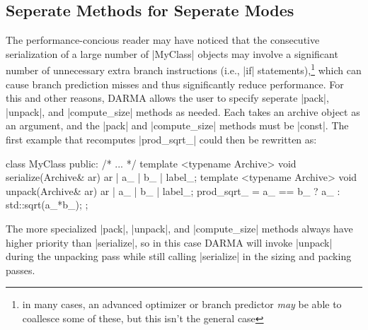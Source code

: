 \subsection{Seperate Methods for Seperate Modes}
The performance-concious reader may have noticed that the consecutive
serialization of a large number of |MyClass| objects may involve a significant
number of unnecessary extra branch instructions (i.e., |if|
statements),\footnote{in many cases, an advanced optimizer or branch predictor
{\it may} be able to coallesce some of these, but this isn't the general case}
which can cause branch prediction misses and thus significantly reduce
performance.  For this and other reasons, DARMA allows the user to specify
seperate |pack|, |unpack|, and |compute_size| methods as needed.  Each takes an
archive object as an argument, and the |pack| and |compute_size| methods must
be |const|.  The first example that recomputes |prod_sqrt_| could then be
rewritten as:
\begin{CppCodeNumb}
class MyClass {
  public:
    /* ... */
    template <typename Archive>
    void serialize(Archive& ar) {
      ar | a_ | b_ | label_;
    }
    template <typename Archive>
    void unpack(Archive& ar) {
      ar | a_ | b_ | label_;
      prod_sqrt_ = a_ == b_ ? a_ : std::sqrt(a_*b_);
    }
};
\end{CppCodeNumb}
The more specialized |pack|, |unpack|, and |compute_size| methods always have
higher priority than |serialize|, so in this case DARMA will invoke |unpack|
during the unpacking pass while still calling |serialize| in the sizing and
packing passes.

